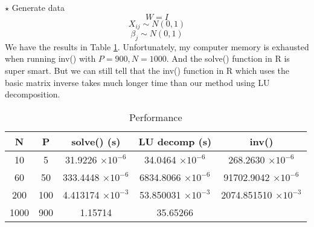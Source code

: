 \documentclass[11pt]{article}
\newcommand{\jie}{$\star$ }
\begin{document}
\begin{enumerate}[(A)]
\jie
Generate data
$$W = I$$
$$X_{ij} \sim N(0,1)$$
$$\beta_j \sim N(0,1)$$
We have the results in Table \ref{tab:performance}. Unfortunately, my computer memory is exhausted when running inv() with $P=900, N=1000$. And the solve() function in R is super smart. But we can still tell that the inv() function in R which uses the basic matrix inverse takes much longer time than our method using LU decomposition.
\begin{table}[]
    \centering
    \begin{tabular}{c|c|c|c|c}
         N & P & solve() (s) & LU decomp (s) & inv() \\ \hline
         10  & 5 & 31.9226 $\times 10^{-6}$ & 34.0464 $\times 10^{-6}$ & 268.2630 $\times 10^{-6}$\\
         60  & 50 & 333.4448 $\times 10^{-6}$ & 6834.8066 $\times 10^{-6}$ & 91702.9042 $\times 10^{-6}$\\
         200  & 100 &  4.413174 $\times 10^{-3}$ & 53.850031 $\times 10^{-3}$ &2074.851510 $\times 10^{-3}$ \\
         1000  & 900 & 1.15714& 35.65266\\
    \end{tabular}
    \caption{Performance}
    \label{tab:performance}
\end{table}

\end{enumerate}
\end{document}
